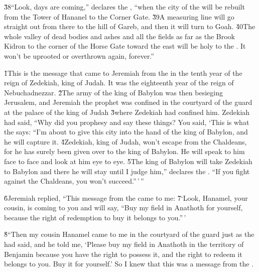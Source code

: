 \v{38}``Look, days are coming,'' declares the , ``when the city of the  will be rebuilt from the Tower of Hananel to the Corner Gate. \v{39}A measuring line will go straight out from there to the hill of Gareb, and then it will turn to Goah. \v{40}The whole valley of dead bodies and ashes and all the fields as far as the Brook Kidron to the corner of the Horse Gate toward the east will be holy to the . It won't be uprooted or overthrown again, forever.''

\v{1}This is the message that came to Jeremiah from the  in the tenth year of the reign of Zedekiah, king of Judah. It was the eighteenth year of the reign of Nebuchadnezzar. \v{2}The army of the king of Babylon was then besieging Jerusalem, and Jeremiah the prophet was confined in the courtyard of the guard at the palace of the king of Judah \v{3}where Zedekiah had confined him. Zedekiah had said, ``Why did you prophesy and say these things? You said, `This is what the  says: ``I'm about to give this city into the hand of the king of Babylon, and he will capture it. \v{4}Zedekiah, king of Judah, won't escape from the Chaldeans, for he has surely been given over to the king of Babylon. He will speak to him face to face and look at him eye to eye. \v{5}The king of Babylon will take Zedekiah to Babylon and there he will stay until I judge him,'' declares the . ``If you fight against the Chaldeans, you won't succeed.''\,'\,''

\v{6}Jeremiah replied, ``This message from the  came to me: \v{7}`Look, Hanamel, your cousin, is coming to you and will say, ``Buy my field in Anathoth for yourself, because the right of redemption to buy it belongs to you.''\,'

\v{8}``Then my cousin Hanamel came to me in the courtyard of the guard just as the  had said, and he told me, `Please buy my field in Anathoth in the territory of Benjamin because you have the right to possess it, and the right to redeem it belongs to you. Buy it for yourself.' So I knew that this was a message from the .

